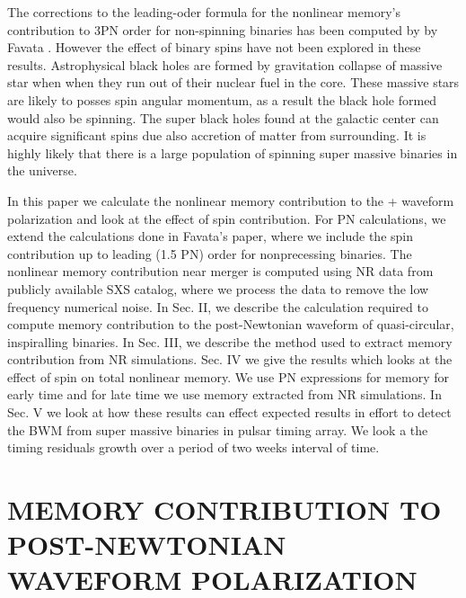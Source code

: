 \documentclass[twocolumn,showpacs,aps,prd,nobibnotes,floatfix]{revtex4-1}
\begin{document}
\par The corrections to the leading-oder formula for the nonlinear memory's contribution to 3PN order for non-spinning binaries has been computed by by Favata \cite{Favata2009}. However the effect of binary spins have not been explored in these results. Astrophysical black holes are formed by gravitation collapse of massive star when when they run out of their nuclear fuel in the core. These massive stars are likely to posses spin angular momentum, as a result the black hole formed would also be spinning. The super black holes found at the galactic center can acquire significant spins due also accretion of matter from surrounding. It is highly likely that there is a large population of spinning super massive binaries in the universe.      
\par In this paper we calculate the nonlinear memory contribution to the + waveform polarization and look at the effect of spin contribution. For PN calculations, we extend the calculations  done in Favata's\cite{Favata2009} paper, where we include the spin contribution up to leading (1.5 PN) order for nonprecessing binaries. The nonlinear memory contribution near merger is computed using NR data from publicly available SXS catalog, where we process the data to remove the low frequency numerical noise. In Sec. II, we describe the calculation required to compute memory contribution to the post-Newtonian waveform of quasi-circular, inspiralling binaries. In Sec. III, we describe the method used to extract memory contribution from NR simulations. Sec. IV we give the results which looks at the effect of spin on total nonlinear memory. We use PN expressions for memory for early time and for late time we use memory extracted from NR simulations. In Sec. V we look at how these results can effect expected results in effort to detect the BWM from super massive binaries in pulsar timing array. We look a the timing residuals growth over a period of two weeks interval of time. 


\section{MEMORY CONTRIBUTION TO POST-NEWTONIAN WAVEFORM POLARIZATION}
\end{document}
